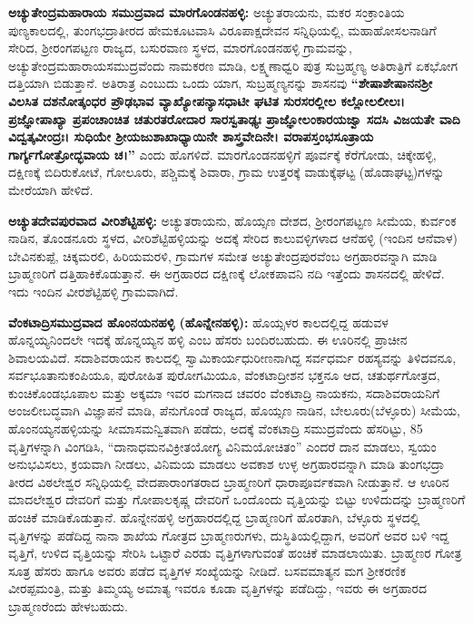 \textbf{ಅಚ್ಯುತೇಂದ್ರಮಹಾರಾಯ ಸಮುದ್ರವಾದ ಮಾರಗೊಂಡನಹಳ್ಳಿ:} ಅಚ್ಯುತರಾಯನು, ಮಕರ ಸಂಕ್ರಾಂತಿಯ ಪುಣ್ಯಕಾಲದಲ್ಲಿ, ತುಂಗಭದ್ರಾತೀರದ ಹೇಮಕೂಟವಾಸಿ ವಿರೂಪಾಕ್ಷದೇವನ ಸನ್ನಿಧಿಯಲ್ಲಿ, ಮಹಾಹೋಸಲನಾಡಿಗೆ ಸೇರಿದ, ಶ‍್ರೀರಂಗಪಟ್ಟಣ ರಾಜ್ಯದ, ಬಸುರವಾಣ ಸ್ಥಳದ, ಮಾರಗೊಂಡನಹಳ್ಳಿ ಗ್ರಾಮವನ್ನು, ಅಚ್ಯುತೇಂದ್ರಮಹಾರಾಯಸಮುದ್ರವೆಂದು ನಾಮಕರಣ ಮಾಡಿ, ಲಕ್ಷ್ಮಣಾಧ್ವರಿ ಪುತ್ರ ಸುಬ್ರಹ್ಮಣ್ಯ ಅತಿರಾತ್ರಿಗೆ ಏಕಭೋಗ ದತ್ತಿಯಾಗಿ ಬಿಡುತ್ತಾನೆ. ಅತಿರಾತ್ರ ಎಂಬುದು ಒಂದು ಯಾಗ, ಸುಬ್ರಹ್ಮಣ್ಯನನ್ನು ಶಾಸನವು \textbf{“ಶೇಷಾಶೇಷಾನನಶ‍್ರೀ ವಿಲಸಿತ ದಶನೋತ್ಕಂಧರ ಪ್ರೌಢಭಾವ ವ್ಯಾಖ್ಯೋಪನ್ಯಾಸಧಾಟೀ ಘಟಿತ ಸುರಸರಲ್ಲೀಲ ಕಲ್ಲೋಲಲೀಲಃ। ಪ್ರಜ್ಞೋಪಾಖ್ಯಾ ಪ್ರಪಂಚಾಂಚಿತ ಚತುರತರೋದಾರ ಸಾರಸ್ವತಾಢ್ಯಃ ಪ್ರಾಜ್ಞೋಲಂಕಾರಯಜ್ವಾ ಸದಸಿ ವಿಜಯತೇ ವಾದಿ ವಿದ್ವತ್ಕವೀಂದ್ರಃ। ಸುಧಿಯೇ ಶ‍್ರೀಯಜುಶಾಖಾಧ್ಯಾಯಿನೇ ಶಾಸ್ತ್ರವೇದಿನೇ। ವರಾಪಸ್ತಂಭಸೂತ್ರಾಯ ಗಾರ್ಗ್ಯಗೋತ್ರೋದ್ಭವಾಯ ಚ।”} ಎಂದು ಹೊಗಳಿದೆ. ಮಾರಗೊಂಡನಹಳ್ಳಿಗೆ ಪೂರ್ವಕ್ಕೆ ಕೆರೆಗೋಡು, ಚಿಕ್ಕೇಹಳ್ಳಿ, ದಕ್ಷಿಣಕ್ಕೆ ಬಿದಿರುಕೋಟೆ, ಗೋಲೂರು, ಪಶ್ಚಿಮಕ್ಕೆ ಶಿವಾರಾ, ಗ್ರಾಮ ಉತ್ತರಕ್ಕೆ ವಾಡುಕ್ಕೆಘಟ್ಟ (ಹೊಡಾಘಟ್ಟ)ಗಳನ್ನು ಮೇರೆಯಾಗಿ ಹೇಳಿದೆ.

\textbf{ಅಚ್ಯುತದೇವಪುರವಾದ ವೀರಿಶೆಟ್ಟಿಹಳ್ಳಿ:} ಅಚ್ಯುತರಾಯನು, ಹೊಯ್ಸಣ ದೇಶದ, ಶ‍್ರೀರಂಗಪಟ್ಟಣ ಸೀಮೆಯ, ಕುರ್ವಂಕ ನಾಡಿನ, ತೊಂಡನೂರು ಸ್ಥಳದ, ವೀರಿಶೆಟ್ಟಿಹಳ್ಳಿಯನ್ನು ಅದಕ್ಕೆ ಸೇರಿದ ಕಾಲುವಳ್ಳಿಗಳಾದ ಆನೆಹಳ್ಳಿ (ಇಂದಿನ ಆನೆವಾಳ) ಬೇವಿನಕುಪ್ಪೆ, ಚಿಕ್ಕಮರಲಿ, ಹಿರಿಯಮರಳಿ, ಗ್ರಾಮಗಳ ಸಮೇತ ಅಚ್ಯುತೇಂದ್ರಪುರವೆಂಬ ಅಗ್ರಹಾರವನ್ನಾಗಿ ಮಾಡಿ ಬ್ರಾಹ್ಮಣರಿಗೆ ದತ್ತಿಹಾಕಿಕೊಡುತ್ತಾನೆ. ಈ ಅಗ್ರಹಾರದ ದಕ್ಷಿಣಕ್ಕೆ ಲೋಕಪಾವನಿ ನದಿ ಇತ್ತೆಂದು ಶಾಸನದಲ್ಲಿ ಹೇಳಿದೆ. ಇದು ಇಂದಿನ ವೀರಶೆಟ್ಟಿಹಳ್ಳಿ ಗ್ರಾಮವಾಗಿದೆ.

\textbf{ವೆಂಕಟಾದ್ರಿಸಮುದ್ರವಾದ ಹೊಂನಯನಹಳ್ಳಿ (ಹೊನ್ನೇನಹಳ್ಳಿ):} ಹೊಯ್ಸಳರ ಕಾಲದಲ್ಲಿದ್ದ ಹಡುವಳ ಹೊನ್ನಯ್ಯನಿಂದಲೇ ಇದಕ್ಕೆ ಹೊನ್ನಯ್ಯನ ಹಳ್ಳಿ ಎಂಬ ಹೆಸರು ಬಂದಿರಬಹುದು. ಈ ಊರಿನಲ್ಲಿ ಪ್ರಾಚೀನ ಶಿವಾಲಯವಿದೆ. ಸದಾಶಿವರಾಯನ ಕಾಲದಲ್ಲಿ ಸ್ವಾಮಿಕಾರ್ಯಧುರೀಣನಾಗಿದ್ದ ಸರ್ವಧರ್ಮ ರಹಸ್ಯವನ್ನು ತಿಳಿದವನೂ, ಸರ್ವಭೂತಾನುಕಂಪಿಯೂ, ಪುರೋಹಿತ ಪುರೋಗಮಿಯೂ, ವೆಂಕಟಾದ್ರೀಶನ ಭಕ್ತನೂ ಆದ, ಚತುರ್ಥಗೋತ್ರದ, ಕುಂಚಿಕೊಂಡಭೂಪಾಲ ಮತ್ತು ಅಕ್ಕಮಾ ಇವರ ಮಗನಾದ ಚವರಂ ವೆಂಕಟಾದ್ರಿ ನಾಯಕನು, ಸದಾಶಿವರಾಯನಿಗೆ ಅಂಜಲೀಬದ್ಧವಾಗಿ ವಿಜ್ಞಾಪನೆ ಮಾಡಿ, ಪೆನುಗೊಂಡೆ ರಾಜ್ಯದ, ಹೊಯ್ಸಣ ನಾಡಿನ, ಬೇಲೂರು(ಬೆಳ್ಳೂರು) ಸೀಮೆಯ, ಹೊಂನಯ್ಯನಹಳ್ಳಿಯನ್ನು ಸೀಮಾಸಮನ್ವಿತವಾಗಿ ಪಡೆದು, ಅದಕ್ಕೆ ವೆಂಕಟಾದ್ರಿ ಸಮುದ್ರವೆಂದು ಹೆಸರಿಟ್ಟು, 85 ವೃತ್ತಿಗಳನ್ನಾಗಿ ವಿಂಗಡಿಸಿ, “ದಾನಾಧಮನವಿಕ್ರೀತಯೋಗ್ಯ ವಿನಿಮಯೋಚಿತಂ” ಎಂದರೆ ದಾನ ಮಾಡಲು, ಸ್ವಯಂ ಅನುಭವಿಸಲು, ಕ್ರಯವಾಗಿ ನೀಡಲು, ವಿನಿಮಯ ಮಾಡಲು ಅವಕಾಶ ಉಳ್ಳ ಅಗ್ರಹಾರವನ್ನಾಗಿ ಮಾಡಿ ತುಂಗಭದ್ರಾ ತೀರದ ವಿಠಲೇಶ್ವರ ಸನ್ನಿಧಿಯಲ್ಲಿ ವೇದಪಾರಾಂಗತರಾದ ಬ್ರಾಹ್ಮಣರಿಗೆ ಧಾರಾಪೂರ್ವಕವಾಗಿ ನೀಡುತ್ತಾನೆ. ಆ ಊರಿನ ಮಾದಲೇಶ್ವರ ದೇವರಿಗೆ ಮತ್ತು ಗೋಪಾಲಕೃಷ್ಣ ದೇವರಿಗೆ ಒಂದೊಂದು ವೃತ್ತಿಯನ್ನು ಬಿಟ್ಟು ಉಳಿದುದನ್ನು ಬ್ರಾಹ್ಮಣರಿಗೆ ಹಂಚಿಕೆ ಮಾಡಿಕೊಡುತ್ತಾನೆ. ಹೊನ್ನೇನಹಳ್ಳಿ ಅಗ್ರಹಾರದಲ್ಲಿದ್ದ ಬ್ರಾಹ್ಮಣರಿಗೆ ಹೊರತಾಗಿ, ಬೆಳ್ಳೂರು ಸ್ಥಳದಲ್ಲಿ ವೃತ್ತಿಗಳನ್ನು ಪಡೆದಿದ್ದ ನಾನಾ ಶಾಖೆಯ ಗೋತ್ರದ ಬ್ರಾಹ್ಮಣರುಗಳು, ದುಸ್ಥಿತಿಯಲ್ಲಿದ್ದಾಗ, ಅವರಿಗೆ ಅವರ ಬಳಿ ಇದ್ದ ವೃತ್ತಿಗೆ, ಉಳಿದ ವೃತ್ತಿಯನ್ನು ಸೇರಿಸಿ ಒಟ್ಟಾರೆ ಎರಡು ವೃತ್ತಿಗಳಾಗುವಂತೆ ಹಂಚಿಕೆ ಮಾಡಲಾಯಿತು. ಬ್ರಾಹ್ಮಣರ ಗೋತ್ರ ಸೂತ್ರ ಹೆಸರು ಹಾಗೂ ಅವರು ಪಡೆದ ವೃತ್ತಿಗಳ ಸಂಖ್ಯೆಯನ್ನು ನೀಡಿದೆ. ಬಸವಮಾತ್ಯನ ಮಗ ಶ‍್ರೀಕರಣಿಕ ವೀರಪ್ಪಮಂತ್ರಿ, ಮತ್ತು ತಿಮ್ಮಯ್ಯ ಅಮಾತ್ಯ ಇವರೂ ಕೂಡಾ ವೃತ್ತಿಗಳನ್ನು ಪಡೆದಿದ್ದು, ಇವರು ಈ ಅಗ್ರಹಾರದ ಬ್ರಾಹ್ಮಣರೆಂದು ಹೇಳಬಹುದು.


